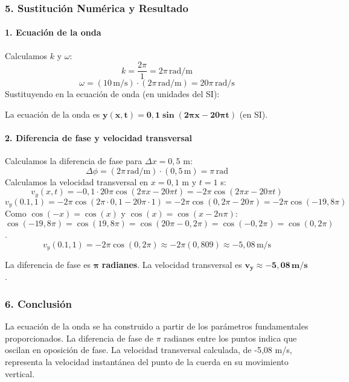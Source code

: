 \subsubsection*{5. Sustitución Numérica y Resultado}
\paragraph{1. Ecuación de la onda}
Calculamos $k$ y $\omega$:
$$k = \frac{2\pi}{1} = 2\pi \, \text{rad/m}$$
$$\omega = (10 \, \text{m/s}) \cdot (2\pi \, \text{rad/m}) = 20\pi \, \text{rad/s}$$
Sustituyendo en la ecuación de onda (en unidades del SI):
\begin{cajaresultado}
    La ecuación de la onda es $\boldsymbol{y(x,t) = 0,1\sin(2\pi x - 20\pi t)}$ (en SI).
\end{cajaresultado}

\paragraph{2. Diferencia de fase y velocidad transversal}
Calculamos la diferencia de fase para $\Delta x = 0,5$ m:
$$\Delta\phi = (2\pi \, \text{rad/m}) \cdot (0,5 \, \text{m}) = \pi \, \text{rad}$$
Calculamos la velocidad transversal en $x=0,1$ m y $t=1$ s:
$$v_y(x,t) = -0,1 \cdot 20\pi \cos(2\pi x - 20\pi t) = -2\pi \cos(2\pi x - 20\pi t)$$
$$v_y(0.1, 1) = -2\pi \cos(2\pi \cdot 0,1 - 20\pi \cdot 1) = -2\pi \cos(0,2\pi - 20\pi) = -2\pi \cos(-19,8\pi)$$
Como $\cos(-x)=\cos(x)$ y $\cos(x) = \cos(x-2n\pi)$: $\cos(-19,8\pi) = \cos(19,8\pi) = \cos(20\pi - 0,2\pi) = \cos(-0,2\pi) = \cos(0,2\pi)$.
$$v_y(0.1, 1) = -2\pi \cos(0,2\pi) \approx -2\pi(0,809) \approx -5,08 \, \text{m/s}$$
\begin{cajaresultado}
    La diferencia de fase es $\boldsymbol{\pi}$ \textbf{radianes}. La velocidad transversal es $\boldsymbol{v_y \approx -5,08 \, \textbf{m/s}}$.
\end{cajaresultado}

\subsubsection*{6. Conclusión}
\begin{cajaconclusion}
La ecuación de la onda se ha construido a partir de los parámetros fundamentales proporcionados. La diferencia de fase de $\pi$ radianes entre los puntos indica que oscilan en oposición de fase. La velocidad transversal calculada, de -5,08 m/s, representa la velocidad instantánea del punto de la cuerda en su movimiento vertical.
\end{cajaconclusion}

